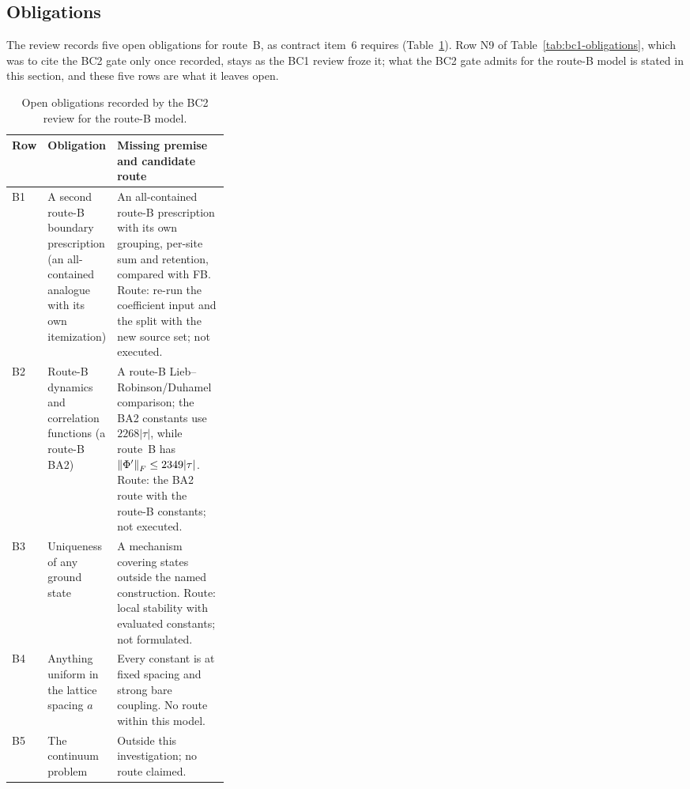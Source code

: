 \subsection{Obligations}
\label{sec:bc2-obligations}
The review records five open obligations for route~B, as contract item~6
requires (Table~\ref{tab:bc2-obligations}). Row N9 of Table~\ref{tab:bc1-obligations},
which was to cite the BC2 gate only once recorded, stays as the BC1 review
froze it; what the BC2 gate admits for the route-B model is stated in this
section, and these five rows are what it leaves open.

\begin{table}[htbp]
\centering\small
\caption{Open obligations recorded by the BC2 review for the route-B model.}
\label{tab:bc2-obligations}
\begin{tabularx}{\linewidth}{@{}>{\raggedright\arraybackslash}p{0.05\linewidth}
 >{\raggedright\arraybackslash}p{0.27\linewidth}
 >{\raggedright\arraybackslash}X@{}}
\toprule
Row & Obligation & Missing premise and candidate route\\
\midrule
B1 & A second route-B boundary prescription (an all-contained analogue with
its own itemization) & An all-contained route-B prescription with its own
grouping, per-site sum and retention, compared with FB. Route: re-run the
coefficient input and the split with the new source set; not executed.\\
B2 & Route-B dynamics and correlation functions (a route-B BA2) & A route-B
Lieb--Robinson/Duhamel comparison; the BA2 constants use $2268|\tau|$, while
route~B has $\left\lVert\Phi'\right\rVert_F\le2349|\tau|$. Route: the BA2 route with the
route-B constants; not executed.\\
B3 & Uniqueness of any ground state & A mechanism covering states outside
the named construction. Route: local stability with evaluated constants; not
formulated.\\
B4 & Anything uniform in the lattice spacing $a$ & Every constant is at fixed
spacing and strong bare coupling. No route within this model.\\
B5 & The continuum problem & Outside this investigation; no route claimed.\\
\bottomrule
\end{tabularx}
\end{table}

